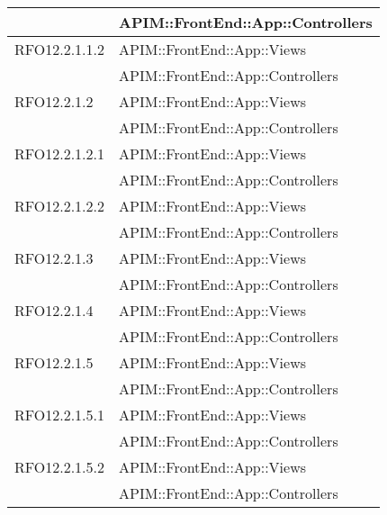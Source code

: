 \begin{longtable}{ p{4cm} | p{12cm} }
			& APIM::FrontEnd::App::Controllers \\
			\hline
			RFO12.2.1.1.2
			& APIM::FrontEnd::App::Views \\
			& APIM::FrontEnd::App::Controllers \\
			\hline
			RFO12.2.1.2
			& APIM::FrontEnd::App::Views \\
			& APIM::FrontEnd::App::Controllers \\
			\hline
			RFO12.2.1.2.1
			& APIM::FrontEnd::App::Views \\
			& APIM::FrontEnd::App::Controllers \\
			\hline
			RFO12.2.1.2.2	
			& APIM::FrontEnd::App::Views \\
			& APIM::FrontEnd::App::Controllers \\
			\hline
			RFO12.2.1.3	
			& APIM::FrontEnd::App::Views \\
			& APIM::FrontEnd::App::Controllers \\
			\hline
			RFO12.2.1.4
			& APIM::FrontEnd::App::Views \\
			& APIM::FrontEnd::App::Controllers \\
			\hline
			RFO12.2.1.5
			& APIM::FrontEnd::App::Views \\
			& APIM::FrontEnd::App::Controllers \\
			\hline
			RFO12.2.1.5.1
			& APIM::FrontEnd::App::Views \\
			& APIM::FrontEnd::App::Controllers \\
			\hline
			RFO12.2.1.5.2
			& APIM::FrontEnd::App::Views \\
			& APIM::FrontEnd::App::Controllers \\
			\hline
		\end{longtable}
